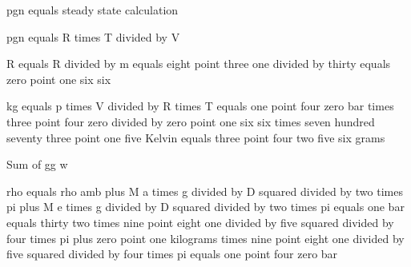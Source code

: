 pgn equals steady state calculation

pgn equals R times T divided by V

R equals R divided by m equals eight point three one divided by thirty equals zero point one six six

kg equals p times V divided by R times T equals one point four zero bar times three point four zero divided by zero point one six six times seven hundred seventy three point one five Kelvin equals three point four two five six grams

Sum of gg w

rho equals rho amb plus M a times g divided by D squared divided by two times pi plus M e times g divided by D squared divided by two times pi equals one bar equals thirty two times nine point eight one divided by five squared divided by four times pi plus zero point one kilograms times nine point eight one divided by five squared divided by four times pi equals one point four zero bar